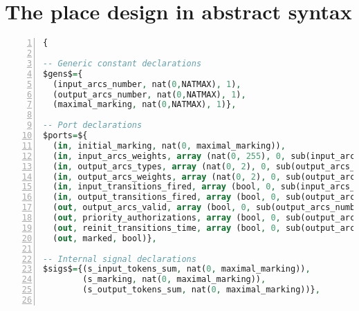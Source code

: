 \section{The place design in abstract \hvhdl{} syntax}
\label{app:place-design}

\begin{lstlisting}[language=VHDL,
  label={lst:place-design-abss},
  caption={The \texttt{place} design in \hvhdl{} abstract syntax.},
  basicstyle=\fontsize{8}{10}\selectfont,
  framexleftmargin=1.5em,
  xleftmargin=2em,
  numbers=left,
  numberstyle=\tiny\ttfamily]
{
    
-- Generic constant declarations
$gens$={
  (input_arcs_number, nat(0,NATMAX), 1), 
  (output_arcs_number, nat(0,NATMAX), 1),
  (maximal_marking, nat(0,NATMAX), 1)},

-- Port declarations
$ports=${
  (in, initial_marking, nat(0, maximal_marking)),
  (in, input_arcs_weights, array (nat(0, 255), 0, sub(input_arcs_number, 1))),
  (in, output_arcs_types, array (nat(0, 2), 0, sub(output_arcs_number, 1))),
  (in, output_arcs_weights, array (nat(0, 2), 0, sub(output_arcs_number, 1))),
  (in, input_transitions_fired, array (bool, 0, sub(input_arcs_number, 1))),          
  (in, output_transitions_fired, array (bool, 0, sub(output_arcs_number, 1))),
  (out, output_arcs_valid, array (bool, 0, sub(output_arcs_number, 1))),
  (out, priority_authorizations, array (bool, 0, sub(output_arcs_number, 1))),
  (out, reinit_transitions_time, array (bool, 0, sub(output_arcs_number, 1))),
  (out, marked, bool)},
  
-- Internal signal declarations
$sigs$={(s_input_tokens_sum, nat(0, maximal_marking)),
        (s_marking, nat(0, maximal_marking)),
        (s_output_tokens_sum, nat(0, maximal_marking))},
       

\end{lstlisting}
